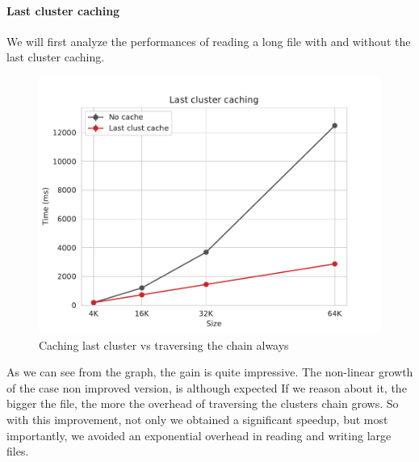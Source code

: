 \documentclass[a4paper,twoside,openright]{report}
\begin{document}
\paragraph{Last cluster caching}
We will first analyze the performances of reading a long file with and without the last cluster caching.
\begin{figure} [H]
	\centering
	\includegraphics[width=0.7\linewidth]{assets/fs_last_clust.pdf}
	\caption{Caching last cluster vs traversing the chain always}
	\label{fig:fs_last_clust_perf}
\end{figure}
As we can see from the graph, the gain is quite impressive.
The non-linear growth of the case non improved version, is although expected
If we reason about it, the bigger the file, the more the overhead of traversing the clusters chain grows.
So with this improvement, not only we obtained a significant speedup, but most importantly, we avoided an exponential overhead in reading and writing large files.
\end{document}
